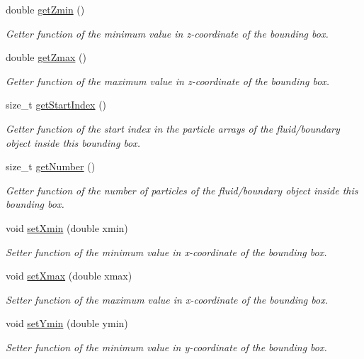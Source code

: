 \begin{DoxyCompactItemize}
double \hyperlink{classBoundingBox_ade1dbb2ee5c33fdc58c086cac4341ef7}{get\-Zmin} ()
\begin{DoxyCompactList}\small\item\em Getter function of the minimum value in z-\/coordinate of the bounding box. \end{DoxyCompactList}\item 
double \hyperlink{classBoundingBox_ad3e816149aa631521a8709da7aefcb9d}{get\-Zmax} ()
\begin{DoxyCompactList}\small\item\em Getter function of the maximum value in z-\/coordinate of the bounding box. \end{DoxyCompactList}\item 
size\-\_\-t \hyperlink{classBoundingBox_aeb37fff91fa78a62d83917f458f8c73a}{get\-Start\-Index} ()
\begin{DoxyCompactList}\small\item\em Getter function of the start index in the particle arrays of the fluid/boundary object inside this bounding box. \end{DoxyCompactList}\item 
size\-\_\-t \hyperlink{classBoundingBox_a52416bd9fb7b39b7a8fbe96702cb40b9}{get\-Number} ()
\begin{DoxyCompactList}\small\item\em Getter function of the number of particles of the fluid/boundary object inside this bounding box. \end{DoxyCompactList}\item 
void \hyperlink{classBoundingBox_a410a30a654c13c2a8c0d5b1f160a1ce9}{set\-Xmin} (double xmin)
\begin{DoxyCompactList}\small\item\em Setter function of the minimum value in x-\/coordinate of the bounding box. \end{DoxyCompactList}\item 
void \hyperlink{classBoundingBox_a118f709267cbd30afbae6e8a73bccea5}{set\-Xmax} (double xmax)
\begin{DoxyCompactList}\small\item\em Setter function of the maximum value in x-\/coordinate of the bounding box. \end{DoxyCompactList}\item 
void \hyperlink{classBoundingBox_afab5bd9f22d342dc75c07e49d0a937ba}{set\-Ymin} (double ymin)
\begin{DoxyCompactList}\small\item\em Setter function of the minimum value in y-\/coordinate of the bounding box. \end{DoxyCompactList}\item 

\end{DoxyCompactItemize}
